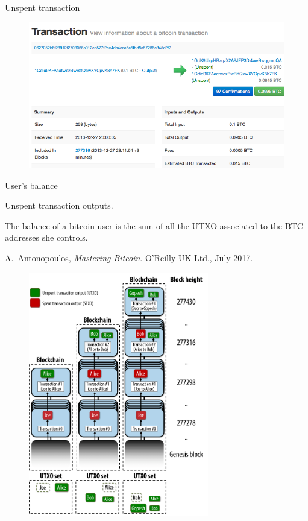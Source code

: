 \documentclass{beamer}
\begin{document}
\begin{frame}{Unspent transaction}
\begin{figure}
  \begin{center}
      \includegraphics[width=\textwidth]{../../Figures/btc_transaction}
  \end{center}
\end{figure}
\end{frame}
\begin{frame}{User's balance}
\begin{tcolorbox}[enhanced,drop shadow, title= UTXO]
Unspent transaction outputs.
\end{tcolorbox}
The balance of a bitcoin user is the sum of all the UTXO associated to the BTC addresses she controls.
\scriptsize{
\begin{thebibliography}{1}
A.~Antonopoulos, {\em Mastering Bitcoin}.
\newblock O'Reilly UK Ltd., July 2017.
\end{thebibliography}  
}
\end{frame}
\begin{frame}[plain]
\begin{figure}
  \begin{center}
      \includegraphics[width=0.7\textwidth]{../../Figures/transaction_tree}
  \end{center}
\end{figure}
\end{frame}
\end{document}
